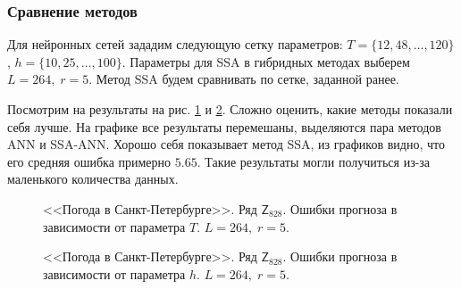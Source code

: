 \documentclass[specialist,
               substylefile = spbu.rtx,
               subf,href,colorlinks=true, 12p]{disser}
\begin{document}
\subsubsection{Сравнение методов}

Для нейронных сетей зададим следующую сетку параметров: $T = \{12, 48, \ldots, 120 \}$, $h = \{10, 25, \ldots, 100 \}$. Параметры для SSA в гибридных методах выберем $L = 264, \; r = 5$. Метод SSA будем сравнивать по сетке, заданной ранее.

Посмотрим на результаты на рис. \ref{weather_comp} и \ref{weather_comp.h}. Сложно оценить, какие методы показали себя лучше. На графике все результаты перемешаны, выделяются пара методов ANN и SSA-ANN. Хорошо себя показывает метод SSA, из графиков видно, что его средняя ошибка примерно $5.65$. Такие результаты могли получиться из-за маленького количества данных.

\begin{figure}[H]
	\captionsetup{justification=centering}
	\caption{<<Погода в Санкт-Петербурге>>. Ряд $\mathsf{Z}_{828}$. Ошибки прогноза в зависимости от параметра $T$. $L = 264, \; r = 5$.}
	\label{weather_comp}
\end{figure}

\begin{figure}[H]
	\captionsetup{justification=centering}
	\caption{<<Погода в Санкт-Петербурге>>. Ряд $\mathsf{Z}_{828}$. Ошибки прогноза в зависимости от параметра $h$. $L = 264, \; r = 5$.}
	\label{weather_comp.h}
\end{figure}
\end{document}
